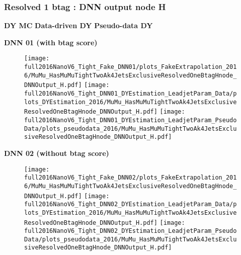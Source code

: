 \documentclass[9pt]{beamer}
\begin{document}
\begin{frame}
	\frametitle{Resolved 1 btag : DNN output node H}
    \hspace{2cm} \textbf{DY MC} \hspace{1.9cm} \textbf{Data-driven DY} \hspace{1cm} \textbf{Pseudo-data DY}
    \begin{center}
        \textbf{DNN 01 (with btag score)}
    \end{center}
	\begin{figure}
		\texttt{[image: full2016NanoV6\_Tight\_Fake\_DNN01/plots\_FakeExtrapolation\_2016/MuMu\_HasMuMuTightTwoAk4JetsExclusiveResolvedOneBtagHnode\_DNNOutput\_H.pdf]}
		\texttt{[image: full2016NanoV6\_Tight\_DNN01\_DYEstimation\_LeadjetParam\_Data/plots\_DYEstimation\_2016/MuMu\_HasMuMuTightTwoAk4JetsExclusiveResolvedOneBtagHnode\_DNNOutput\_H.pdf]}
		\texttt{[image: full2016NanoV6\_Tight\_DNN01\_DYEstimation\_LeadjetParam\_PseudoData/plots\_pseudodata\_2016/MuMu\_HasMuMuTightTwoAk4JetsExclusiveResolvedOneBtagHnode\_DNNOutput\_H.pdf]}
	\end{figure}
    \begin{center}
        \textbf{DNN 02 (without btag score)}
    \end{center}
	\begin{figure}
		\texttt{[image: full2016NanoV6\_Tight\_Fake\_DNN02/plots\_FakeExtrapolation\_2016/MuMu\_HasMuMuTightTwoAk4JetsExclusiveResolvedOneBtagHnode\_DNNOutput\_H.pdf]}
		\texttt{[image: full2016NanoV6\_Tight\_DNN02\_DYEstimation\_LeadjetParam\_Data/plots\_DYEstimation\_2016/MuMu\_HasMuMuTightTwoAk4JetsExclusiveResolvedOneBtagHnode\_DNNOutput\_H.pdf]}
		\texttt{[image: full2016NanoV6\_Tight\_DNN02\_DYEstimation\_LeadjetParam\_PseudoData/plots\_pseudodata\_2016/MuMu\_HasMuMuTightTwoAk4JetsExclusiveResolvedOneBtagHnode\_DNNOutput\_H.pdf]}
	\end{figure}
\end{frame}
\end{document}
